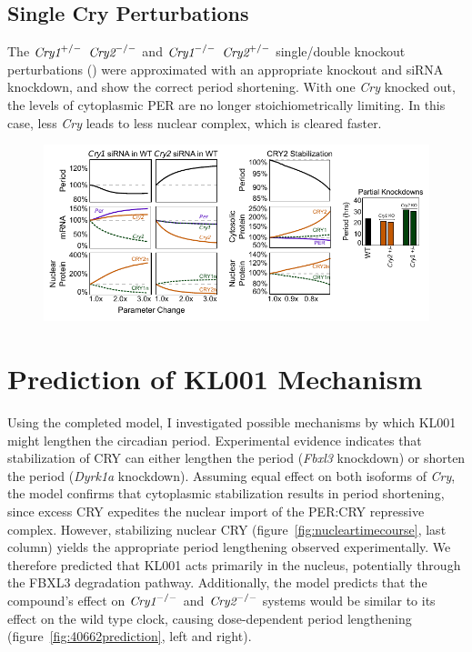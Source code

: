   \subsection{Single Cry Perturbations} The $\text{\it Cry1}^{+/-}$ $\text{\it Cry2}^{-/-}$ and $\text{\it Cry1}^{-/-}$ $\text{\it Cry2}^{+/-}$ single/double knockout perturbations (\cite{VanderHorst1999}) were approximated with an appropriate knockout and siRNA knockdown, and show the correct period shortening. With one {\it Cry} knocked out, the levels of cytoplasmic PER are no longer stoichiometrically limiting. In this case, less {\it Cry} leads to less nuclear complex, which is cleared faster.

  \begin{figure}[bt]
    \centering
    \begin{minipage}{\textwidth}
      \centering
      \includegraphics[width=\textwidth]{chap2/figures/experimentalvalidation.pdf}
       \label{fig:experimentalvalidation}
    \end{minipage}
  \end{figure}

  \section{Prediction of KL001 Mechanism}
  Using the completed model, I investigated possible mechanisms by which KL001 might lengthen the circadian period. Experimental evidence indicates that stabilization of CRY can either lengthen the period ({\it Fbxl3} knockdown) or shorten the period ({\it Dyrk1a} knockdown). Assuming equal effect on both isoforms of {\it Cry}, the model confirms that cytoplasmic stabilization results in period shortening, since excess CRY expedites the nuclear import of the PER:CRY repressive complex. However, stabilizing nuclear CRY (figure~\ref{fig:nucleartimecourse}, last column) yields the appropriate period lengthening observed experimentally. We therefore predicted that KL001 acts primarily in the nucleus, potentially through the FBXL3 degradation pathway. Additionally, the model predicts that the compound’s effect on $\text{\it Cry1}^{-/-}$ and $\text{\it Cry2}^{-/-}$ systems would be similar to its effect on the wild type clock, causing dose-dependent period lengthening (figure~\ref{fig:40662prediction}, left and right).

